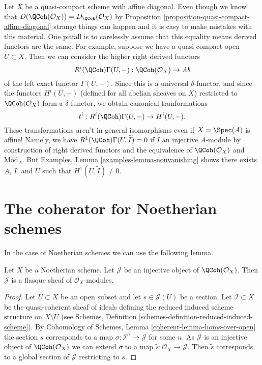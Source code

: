 \begin{remark}[Warning]
\label{remark-warning-coherator}
Let $X$ be a quasi-compact scheme with affine diagonal. Even though we know
that $D(\QCoh(\mathcal{O}_X)) = D_\QCoh(\mathcal{O}_X)$ by
Proposition \ref{proposition-quasi-compact-affine-diagonal}
strange things can
happen and it is easy to make mistakes with this material. One pitfall
is to carelessly assume that this equality means derived functors are the same.
For example, suppose we have a quasi-compact open $U \subset X$. Then we can
consider the higher right derived functors
$$
R^i(\QCoh)\Gamma(U, -) : \QCoh(\mathcal{O}_X) \to \textit{Ab}
$$
of the left exact functor $\Gamma(U, -)$. Since this is a universal
$\delta$-functor, and since the functors $H^i(U, -)$ (defined for all
abelian sheaves on $X$) restricted to $\QCoh(\mathcal{O}_X)$ form
a $\delta$-functor, we obtain canonical tranformations
$$
t^i : R^i(\QCoh)\Gamma(U, -) \to H^i(U, -).
$$
These transformations aren't in general isomorphisms even if $X = \Spec(A)$
is affine! Namely, we have $R^1(\QCoh)\Gamma(U, \widetilde{I}) = 0$
if $I$ an injective $A$-module by construction of right derived functors
and the equivalence of $\QCoh(\mathcal{O}_X)$ and $\text{Mod}_A$.
But Examples, Lemma \ref{examples-lemma-nonvanishing}
shows there exists $A$, $I$, and $U$ such that
$H^1(U, \widetilde{I}) \not = 0$.
\end{remark}




\section{The coherator for Noetherian schemes}
\label{section-coherator-Noetherian}

\noindent
In the case of Noetherian schemes we can use the following lemma.

\begin{lemma}
\label{lemma-injective-quasi-coherent-sheaf-Noetherian}
Let $X$ be a Noetherian scheme. Let $\mathcal{J}$ be an injective
object of $\QCoh(\mathcal{O}_X)$. Then $\mathcal{J}$
is a flasque sheaf of $\mathcal{O}_X$-modules.
\end{lemma}

\begin{proof}
Let $U \subset X$ be an open subset and let $s \in \mathcal{J}(U)$
be a section. Let $\mathcal{I} \subset X$ be the quasi-coherent sheaf
of ideals defining the reduced induced scheme structure on $X \setminus U$
(see Schemes, Definition \ref{schemes-definition-reduced-induced-scheme}).
By Cohomology of Schemes, Lemma \ref{coherent-lemma-homs-over-open}
the section $s$ corresponds to a map $\sigma : \mathcal{I}^n \to \mathcal{J}$
for some $n$. As $\mathcal{J}$ is an injective object of
$\QCoh(\mathcal{O}_X)$ we can extend $\sigma$ to a map
$\tilde s : \mathcal{O}_X \to \mathcal{J}$. Then $\tilde s$ corresponds
to a global section of $\mathcal{J}$ restricting to $s$.
\end{proof}


